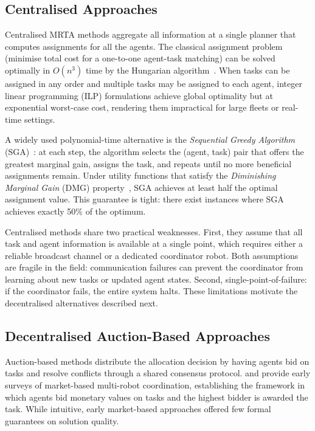 \subsection{Centralised Approaches}
\label{subsec:bg_centralised}

Centralised MRTA methods aggregate all information at a single planner that
computes assignments for all the agents.
The classical assignment problem (minimise total cost for a one-to-one
agent-task matching) can be solved optimally in $O(n^3)$ time by the Hungarian
algorithm~\cite{kuhn1955hungarian}.
When tasks can be assigned in any order and multiple tasks may be assigned to
each agent, integer linear programming (ILP) formulations achieve global
optimality but at exponential worst-case cost, rendering them impractical
for large fleets or real-time settings.

A widely used polynomial-time alternative is the \emph{Sequential Greedy
Algorithm} (SGA)~\cite{minoux1978accelerated}: at each step, the algorithm
selects the (agent, task) pair that offers the greatest marginal gain, assigns
the task, and repeats until no more beneficial assignments remain.
Under utility functions that satisfy the \emph{Diminishing Marginal Gain}
(DMG) property~\cite{fisher1978analysis}, SGA achieves at least half the
optimal assignment value.
This guarantee is tight: there exist instances where SGA achieves exactly
50\% of the optimum.

Centralised methods share two practical weaknesses.
First, they assume that all task and agent information is available at a single
point, which requires either a reliable broadcast channel or a dedicated
coordinator robot.
Both assumptions are fragile in the field: communication failures can prevent
the coordinator from learning about new tasks or updated agent states.
Second, single-point-of-failure: if the coordinator fails, the entire system
halts.
These limitations motivate the decentralised alternatives described next.


\subsection{Decentralised Auction-Based Approaches}
\label{subsec:bg_decentralised}

Auction-based methods distribute the allocation decision by having agents bid
on tasks and resolve conflicts through a shared consensus protocol.
\citet{gerkey2002sold} and \citet{dias2006market} provide early surveys of
market-based multi-robot coordination, establishing the framework in which
agents bid monetary values on tasks and the highest bidder is awarded the task.
While intuitive, early market-based approaches offered few formal guarantees
on solution quality.

